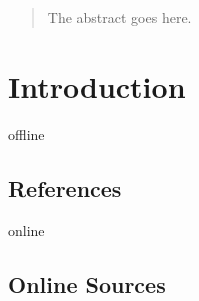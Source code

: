 \documentclass[12pt,a4paper]{report}
\begin{document}


\begin{abstract}
The abstract goes here.
\end{abstract}

\tableofcontents

\chapter{Introduction} \label{chap:intro}



\newpage




\begin{btSect}{offline}
\section*{References}
\btPrintCited
\end{btSect}
\begin{btSect}{online}
\section*{Online Sources}
\btPrintCited
\end{btSect}
\end{document}
